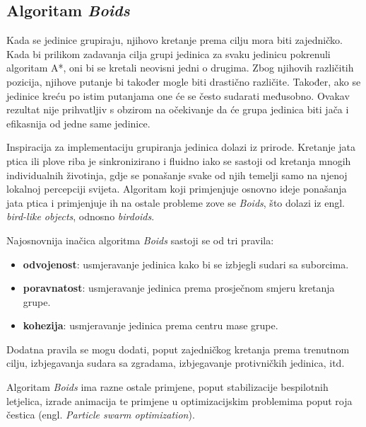 \documentclass[times, utf8, zavrsni, numeric]{fer}
\begin{document}

\subsection{Algoritam \textit{Boids}}

\par Kada se jedinice grupiraju, njihovo kretanje prema cilju mora biti zajedničko.
Kada bi prilikom zadavanja cilja grupi jedinica za svaku jedinicu pokrenuli algoritam A*, oni bi se kretali neovisni jedni o drugima. 
Zbog njihovih različitih pozicija, njihove putanje bi također mogle biti drastično različite. 
Također, ako se jedinice kreću po istim putanjama one će se često sudarati međusobno. 
Ovakav rezultat nije prihvatljiv s obzirom na očekivanje da će grupa jedinica biti jača i efikasnija od jedne same jedinice.

\par Inspiracija za implementaciju grupiranja jedinica dolazi iz prirode. 
Kretanje jata ptica ili plove riba je sinkronizirano i fluidno iako se sastoji od kretanja mnogih individualnih životinja, gdje se ponašanje svake od njih temelji samo na njenoj lokalnoj percepciji svijeta.
Algoritam koji primjenjuje osnovno ideje ponašanja jata ptica i primjenjuje ih na ostale probleme zove se \textit{Boids}, što dolazi iz engl. \textit{bird-like objects}, odnosno \textit{birdoids}\cite{article:FlocksHerdsSchools}.

\par Najosnovnija inačica algoritma \textit{Boids} sastoji se od tri pravila:
\begin{itemize}
	\item \textbf{odvojenost}: usmjeravanje jedinica kako bi se izbjegli sudari sa suborcima.
	\item \textbf{poravnatost}: usmjeravanje jedinica prema prosječnom smjeru kretanja grupe.
	\item \textbf{kohezija}: usmjeravanje jedinica prema centru mase grupe. 	 
\end{itemize}
Dodatna pravila se mogu dodati, poput zajedničkog kretanja prema trenutnom cilju, izbjegavanja sudara sa zgradama, izbjegavanje protivničkih jedinica, itd.

\par Algoritam \textit{Boids} ima razne ostale primjene, poput stabilizacije bespilotnih letjelica, izrade animacija te primjene u optimizacijskim problemima poput roja čestica (engl. \textit{Particle swarm optimization}).
\end{document}

